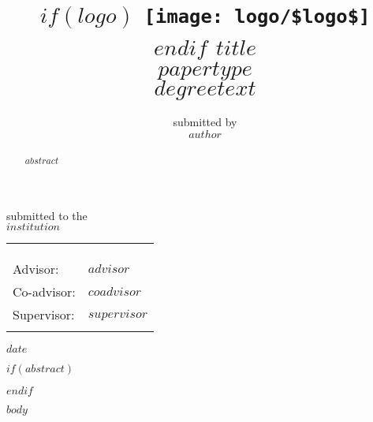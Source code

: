 \documentclass[11pt,a4paper,twoside,openright,openbib]{memoir}
\author{
  \small{submitted by} \vspace{.5cm} 											\\
	\Large{\textbf{$author$}}}
\title{
	\textbf{\vspace{-2.5cm}
	$if(logo)$
	  \texttt{[image: logo/\$logo\$]} \\
	$endif$
	\vspace{3cm}\Huge{$title$} }\\
	\vspace{1cm}
	\Large{\textbf{$papertype$}} \\
	\normalsize{$degreetext$}}
\date{}
\begin{document}
\frontmatter

\begin{titlingpage}
  \begin{center}
    \maketitle
    \vspace{-1cm}
    \small{submitted to the} \\
    \small{$institution$}

    \begin{tabular}{ll}
    & \\
    & \\
    & \\
    Advisor: & $advisor$ \\
    Co-advisor: & $coadvisor$ \\
    Supervisor: & $supervisor$ \\
    & \\
    \end{tabular}

    \vspace{\fill}
    \small{$date$}
  \end{center}
\end{titlingpage}

\setcounter{page}{1}

$if(abstract)$
  \abstractintoc
  \abstractnum
  \begin{abstract}
  $abstract$
  \end{abstract}
$endif$

\cleardoublepage

\tableofcontents*

\cleardoublepage

\listoffigures

\mainmatter
$body$
\end{document}
